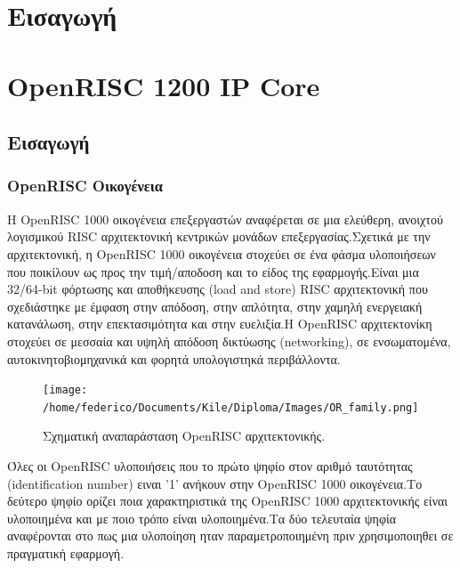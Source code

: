 \documentclass[a4paper,10pt]{article}
\numberwithin{figure}{subsection}
\numberwithin{table}{subsection}
\begin{document}

\newpage
\tableofcontents
\newpage
\listoffigures
\newpage
\listoftables
\newpage

\section{Εισαγωγή}
{


}

\newpage
\section{OpenRISC 1200 IP Core}
{
\subsection{Εισαγωγή}

\subsubsection{OpenRISC Οικογένεια}
Η OpenRISC 1000 οικογένεια επεξεργαστών αναφέρεται σε μια ελεύθερη, ανοιχτού
λογισμικού RISC αρχιτεκτονική κεντρικών μονάδων επεξεργασίας.Σχετικά με την
αρχιτεκτονική, η OpenRISC 1000 οικογένεια στοχεύει σε ένα φάσμα υλοποιήσεων που	
ποικίλουν ως προς την τιμή/αποδοση και το είδος της εφαρμογής.Είναι μια 
32/64-bit φόρτωσης και αποθήκευσης (load and store) RISC αρχιτεκτονική που σχεδιάστηκε
με έμφαση στην απόδοση, στην απλότητα, στην χαμηλή ενεργειακή κατανάλωση, στην επεκτασιμότητα
και στην ευελιξία.Η OpenRISC αρχιτεκτονίκη στοχεύει σε μεσσαία και υψηλή απόδοση
δικτύωσης (networking), σε ενσωματομένα, αυτοκινητοβιομηχανικά και φορητά υπολογιστηκά περιβάλλοντα.

\vspace{0.7cm}
\begin{figure}[h!]
 \centering
 \texttt{[image: /home/federico/Documents/Kile/Diploma/Images/OR\_family.png]}
 \caption{Σχηματική αναπαράσταση OpenRISC αρχιτεκτονικής.}
\end{figure}
\vspace{0.7cm}


Όλες οι OpenRISC υλοποιήσεις που το πρώτο ψηφίο στον αριθμό ταυτότητας
(identification number) ειναι '1' ανήκουν στην 
OpenRISC 1000 οικογένεια.Το δεύτερο ψηφίο ορίζει ποια χαρακτηριστικά της OpenRISC
1000 αρχιτεκτονικής είναι υλοποιημένα και με ποιο τρόπο είναι υλοποιημένα.Τα δύο
τελευταία ψηφία αναφέρονται στο πως μια υλοποίηση ηταν παραμετροποιημένη πριν 
χρησιμοποιηθει σε πραγματική εφαρμογή.

}
\end{document}
